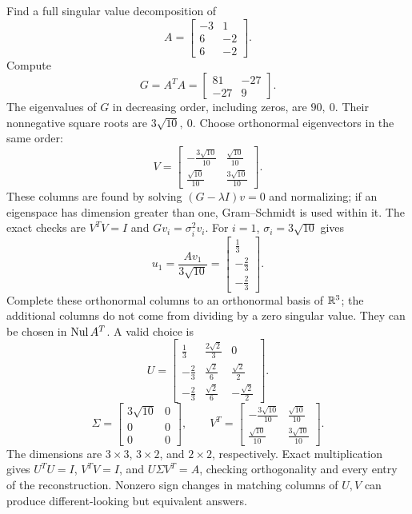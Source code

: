 \goal Find a full singular value decomposition of
\[A=\begin{bmatrix}-3&1\\6&-2\\6&-2\end{bmatrix}.\]
Compute
\[G=A^TA=\begin{bmatrix}81&-27\\-27&9\end{bmatrix}.\]
The eigenvalues of $G$ in decreasing order, including zeros, are $90,\ 0$. Their nonnegative square roots are $3 \sqrt{10},\ 0$. Choose orthonormal eigenvectors in the same order:
\[V=\begin{bmatrix}- \frac{3 \sqrt{10}}{10}&\frac{\sqrt{10}}{10}\\\frac{\sqrt{10}}{10}&\frac{3 \sqrt{10}}{10}\end{bmatrix}.\]
These columns are found by solving $(G-\lambda I)v=0$ and normalizing; if an eigenspace has dimension greater than one, Gram--Schmidt is used within it. The exact checks are $V^TV=I$ and $Gv_i=\sigma_i^2v_i$.
For $i=1$, $\sigma_i=3 \sqrt{10}$ gives
\[u_{1}=\frac{Av_{1}}{3 \sqrt{10}}=\begin{bmatrix}\frac{1}{3}\\- \frac{2}{3}\\- \frac{2}{3}\end{bmatrix}.\]
Complete these orthonormal columns to an orthonormal basis of $\mathbb{R}^{3}$; the additional columns do not come from dividing by a zero singular value. They can be chosen in $\operatorname{Nul} A^T$.
A valid choice is
\[U=\begin{bmatrix}\frac{1}{3}&\frac{2 \sqrt{2}}{3}&0\\- \frac{2}{3}&\frac{\sqrt{2}}{6}&\frac{\sqrt{2}}{2}\\- \frac{2}{3}&\frac{\sqrt{2}}{6}&- \frac{\sqrt{2}}{2}\end{bmatrix}.\]
\[\Sigma=\begin{bmatrix}3 \sqrt{10}&0\\0&0\\0&0\end{bmatrix},\qquad V^T=\begin{bmatrix}- \frac{3 \sqrt{10}}{10}&\frac{\sqrt{10}}{10}\\\frac{\sqrt{10}}{10}&\frac{3 \sqrt{10}}{10}\end{bmatrix}.\]
The dimensions are $3\times3$, $3\times2$, and $2\times2$, respectively. Exact multiplication gives $U^TU=I$, $V^TV=I$, and $U\Sigma V^T=A$, checking orthogonality and every entry of the reconstruction. Nonzero sign changes in matching columns of $U,V$ can produce different-looking but equivalent answers.


